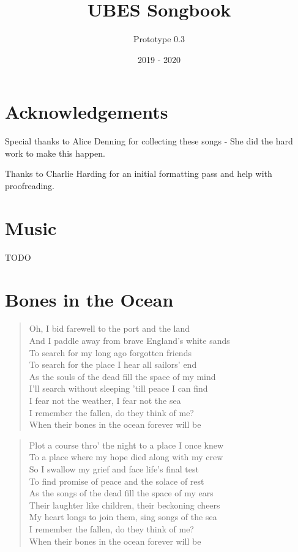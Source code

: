 \documentclass[8pt,twoside]{extarticle}
\title{UBES Songbook}
\author{Prototype 0.3}
\date{2019 - 2020}
\newenvironment{xverse}{
	\interlinepenalty 10000
	\begin{verse}
	\begin{minipage}{\linewidth}
	\parskip 5pt
	\vspace{-6pt}
	}
	{
	\end{minipage}
	\end{verse}
	\penalty 0
	\vspace{-6pt}
	}
\begin{document}

\maketitle
\newpage

\section*{Acknowledgements}
\center
Special thanks to Alice Denning for collecting these songs - She did the hard
work to make this happen.

Thanks to Charlie Harding for an initial formatting pass and help with
proofreading.
\newpage

\tableofcontents

\section{Music}
TODO


\section{Bones in the Ocean}

\begin{xverse}
Oh, I bid farewell to the port and the land \\
And I paddle away from brave England's white sands \\
To search for my long ago forgotten friends \\
To search for the place I hear all sailors’ end \\
As the souls of the dead fill the space of my mind \\
I'll search without sleeping 'till peace I can find \\
I fear not the weather, I fear not the sea \\
I remember the fallen, do they think of me? \\
When their bones in the ocean forever will be \\
\end{xverse}

\begin{xverse}
Plot a course thro' the night to a place I once knew \\
To a place where my hope died along with my crew \\
So I swallow my grief and face life's final test \\
To find promise of peace and the solace of rest \\
As the songs of the dead fill the space of my ears \\
Their laughter like children, their beckoning cheers \\
My heart longs to join them, sing songs of the sea \\
I remember the fallen, do they think of me? \\
When their bones in the ocean forever will be \\
\end{xverse}
\end{document}
